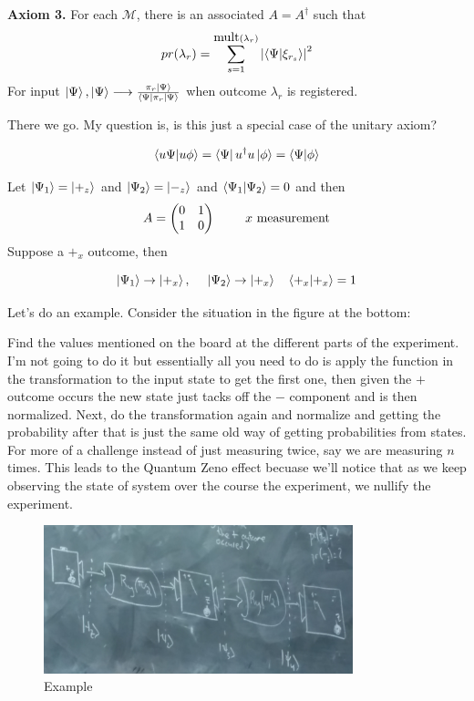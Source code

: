 \documentclass[english, 11pt]{article}
\begin{document}
      \textbf{Axiom 3.} For each $\mathcal{M}$, there is an associated $A = A^\dagger$ such that
      \[ pr(\lambda_r) = \sum_{s=1}^{\mbox{mult}(\lambda_r)} \left| \braket{\Psi}{\xi_{r_s}} \right|^2 \]
      For input $\left|\Psi\right\rangle, \left|\Psi\right\rangle \longrightarrow \frac{\pi_r\left|\Psi\right\rangle}{\left\langle\Psi\right|\pi_r\left|\Psi\right\rangle}$
      when outcome $\lambda_r$ is registered.

      There we go. My question is, is this just a special case of the unitary axiom?

      \[ \braket{u\Psi}{u\phi} = \bra{\Psi}u^\dagger u\ket{\phi} = \braket{\Psi}{\phi} \]

      Let $\left|\Psi_1\right\rangle = \left|+_z\right\rangle$ and $\left|\Psi_2\right\rangle = \left|-_z\right\rangle$ and $\braket{\Psi_1}{\Psi_2} = 0$ and then
      \[ A = \mtx{0 & 1 \\ 1 & 0} \mbox{ \ \ \ \ \ \ $x$ measurement} \]
      Suppose a $+_x$ outcome, then

      \[ \ket{\Psi_1} \rightarrow \ket{+_x}, \ \ \ \ \ket{\Psi_2} \rightarrow \ket{+_x} \ \ \ \braket{+_x}{+_x} = 1 \]

      Let's do an example. Consider the situation in the figure at the bottom:

      Find the values mentioned on the board at the different parts of the experiment. I'm not going to do it but essentially all you need to do is apply the function in the transformation to the input state to get the first one, then given the $+$ outcome occurs the new state just tacks off the $-$ component and is then normalized. Next, do the transformation again and normalize and getting the probability after that is just the same old way of getting probabilities from states. For more of a challenge instead of just measuring twice, say we are measuring $n$ times. This leads to the Quantum Zeno effect becuase we'll notice that as we keep observing the state of system over the course the experiment, we nullify the experiment.

      \begin{figure}[b!]
            \centering
            \includegraphics[width=0.8\textwidth]{axiom3_exmp.jpg}
            \caption{Example}
      \end{figure}

  
\end{document}
